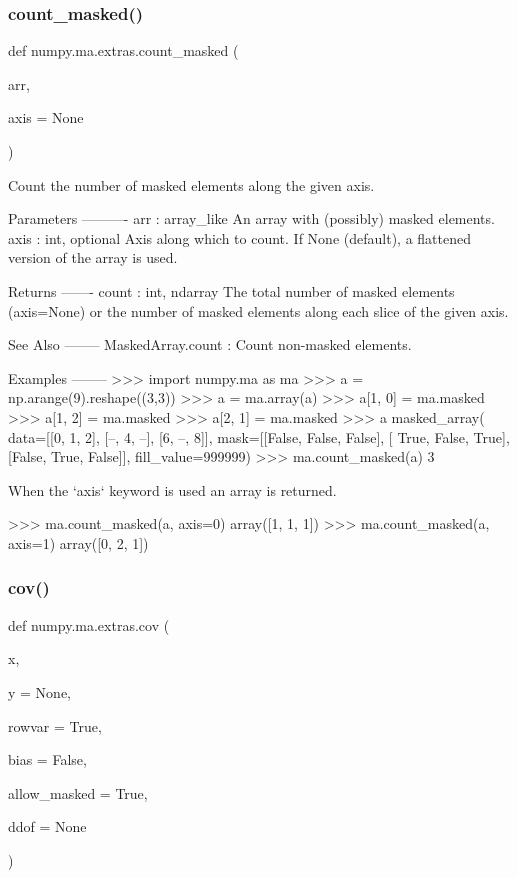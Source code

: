 \subsubsection{\texorpdfstring{count\+\_\+masked()}{count\_masked()}}
{\footnotesize\ttfamily def numpy.\+ma.\+extras.\+count\+\_\+masked (\begin{DoxyParamCaption}\item[{}]{arr,  }\item[{}]{axis = {\ttfamily None} }\end{DoxyParamCaption})}

\begin{DoxyVerb}Count the number of masked elements along the given axis.

Parameters
----------
arr : array_like
    An array with (possibly) masked elements.
axis : int, optional
    Axis along which to count. If None (default), a flattened
    version of the array is used.

Returns
-------
count : int, ndarray
    The total number of masked elements (axis=None) or the number
    of masked elements along each slice of the given axis.

See Also
--------
MaskedArray.count : Count non-masked elements.

Examples
--------
>>> import numpy.ma as ma
>>> a = np.arange(9).reshape((3,3))
>>> a = ma.array(a)
>>> a[1, 0] = ma.masked
>>> a[1, 2] = ma.masked
>>> a[2, 1] = ma.masked
>>> a
masked_array(
  data=[[0, 1, 2],
        [--, 4, --],
        [6, --, 8]],
  mask=[[False, False, False],
        [ True, False,  True],
        [False,  True, False]],
  fill_value=999999)
>>> ma.count_masked(a)
3

When the `axis` keyword is used an array is returned.

>>> ma.count_masked(a, axis=0)
array([1, 1, 1])
>>> ma.count_masked(a, axis=1)
array([0, 2, 1])\end{DoxyVerb}
 \mbox{\label{namespacenumpy_1_1ma_1_1extras_a621878d481405c2ed2c0d47fce7e576d}} 
\subsubsection{\texorpdfstring{cov()}{cov()}}
{\footnotesize\ttfamily def numpy.\+ma.\+extras.\+cov (\begin{DoxyParamCaption}\item[{}]{x,  }\item[{}]{y = {\ttfamily None},  }\item[{}]{rowvar = {\ttfamily True},  }\item[{}]{bias = {\ttfamily False},  }\item[{}]{allow\+\_\+masked = {\ttfamily True},  }\item[{}]{ddof = {\ttfamily None} }\end{DoxyParamCaption})}

